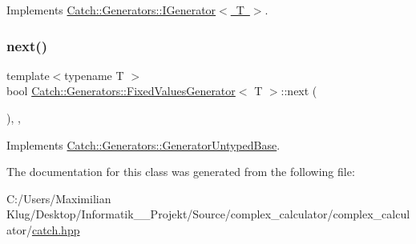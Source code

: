 Implements \mbox{\hyperlink{struct_catch_1_1_generators_1_1_i_generator_a525d381fc9249a885b075a0632a8579a}{Catch\+::\+Generators\+::\+I\+Generator$<$ T $>$}}.

\mbox{\label{class_catch_1_1_generators_1_1_fixed_values_generator_a6ce9e3ed045239c7b82873f24bd9cd3b}} 
\subsubsection{\texorpdfstring{next()}{next()}}
{\footnotesize\ttfamily template$<$typename T $>$ \\
bool \mbox{\hyperlink{class_catch_1_1_generators_1_1_fixed_values_generator}{Catch\+::\+Generators\+::\+Fixed\+Values\+Generator}}$<$ T $>$\+::next (\begin{DoxyParamCaption}{ }\end{DoxyParamCaption})\hspace{0.3cm}{\ttfamily [inline]}, {\ttfamily [override]}, {\ttfamily [virtual]}}



Implements \mbox{\hyperlink{class_catch_1_1_generators_1_1_generator_untyped_base_aeed3c0cd6233c5f553549e453b8d6638}{Catch\+::\+Generators\+::\+Generator\+Untyped\+Base}}.



The documentation for this class was generated from the following file\+:\begin{DoxyCompactItemize}
\item 
C\+:/\+Users/\+Maximilian Klug/\+Desktop/\+Informatik\+\_\+\_\+\+Projekt/\+Source/complex\+\_\+calculator/complex\+\_\+calculator/\mbox{\hyperlink{catch_8hpp}{catch.\+hpp}}\end{DoxyCompactItemize}
